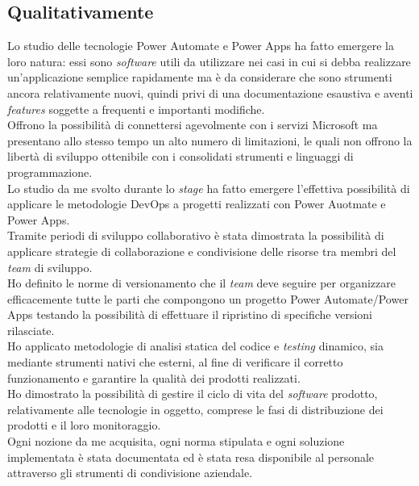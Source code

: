 \subsection{Qualitativamente}
Lo studio delle tecnologie Power Automate e Power Apps ha fatto emergere la loro natura: essi sono \emph{software} utili da utilizzare nei casi in cui si debba realizzare un'applicazione semplice rapidamente ma è da considerare che sono strumenti ancora relativamente nuovi, quindi privi di una documentazione esaustiva e aventi \emph{features} soggette a frequenti e importanti modifiche.\\
Offrono la possibilità di connettersi agevolmente con i servizi Microsoft ma presentano allo stesso tempo un alto numero di limitazioni, le quali non offrono la libertà di sviluppo ottenibile con i consolidati strumenti e linguaggi di programmazione.\\ 
Lo studio da me svolto durante lo \emph{stage} ha fatto emergere l'effettiva possibilità di applicare le metodologie \gls{DevOps} a progetti realizzati con Power Auotmate e Power Apps.\\
Tramite periodi di sviluppo collaborativo è stata dimostrata la possibilità di applicare strategie di collaborazione e condivisione delle risorse tra membri del \emph{team} di sviluppo.\\ 
Ho definito le norme di versionamento che il \emph{team} deve seguire per organizzare efficacemente tutte le parti che compongono un progetto Power Automate/Power Apps testando la possibilità di effettuare il ripristino di specifiche versioni rilasciate.\\ 
Ho applicato metodologie di analisi statica del codice e \emph{testing} dinamico, sia mediante strumenti nativi che esterni, al fine di verificare il corretto funzionamento e garantire la qualità dei prodotti realizzati.\\ 
Ho dimostrato la possibilità di gestire il ciclo di vita del \emph{software} prodotto, relativamente alle tecnologie in oggetto, comprese le fasi di distribuzione dei prodotti e il loro monitoraggio.\\ 
Ogni nozione da me acquisita, ogni norma stipulata e ogni soluzione implementata è stata documentata ed è stata resa disponibile al personale attraverso gli strumenti di condivisione aziendale. 

